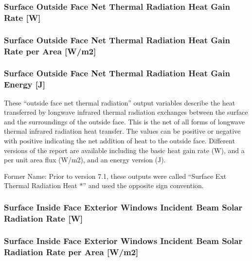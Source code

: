 \subsubsection{Surface Outside Face Net Thermal Radiation Heat Gain Rate {[}W{]}}\label{surface-outside-face-net-thermal-radiation-heat-gain-rate-w}

\subsubsection{Surface Outside Face Net Thermal Radiation Heat Gain Rate per Area {[}W/m2{]}}\label{surface-outside-face-net-thermal-radiation-heat-gain-rate-per-area-wm2}

\subsubsection{Surface Outside Face Net Thermal Radiation Heat Gain Energy {[}J{]}}\label{surface-outside-face-net-thermal-radiation-heat-gain-energy-j}

These ``outside face net thermal radiation'' output variables describe the heat transferred by longwave infrared thermal radiation exchanges between the surface and the surroundings of the outside face. This is the net of all forms of longwave thermal infrared radiation heat transfer. The values can be positive or negative with positive indicating the net addition of heat to the outside face. Different versions of the report are available including the basic heat gain rate (W), and a per unit area flux (W/m2), and an energy version (J).

Former Name: Prior to version 7.1, these outputs were called ``Surface Ext Thermal Radiation Heat *'' and used the opposite sign convention.

\subsubsection{Surface Inside Face Exterior Windows Incident Beam Solar Radiation Rate {[}W{]}}\label{surface-inside-face-exterior-windows-incident-beam-solar-radiation-rate-w}

\subsubsection{Surface Inside Face Exterior Windows Incident Beam Solar Radiation Rate per Area {[}W/m2{]}}\label{surface-inside-face-exterior-windows-incident-beam-solar-radiation-rate-per-area-wm2}

